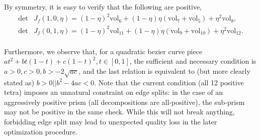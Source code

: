 By symmetry, 
it is easy to verify {that the following are positive},
\begin{align*}
    \det& J_f(1,0,\eta) = (1-\eta)^2 \text{vol}_6 + (1-\eta)\eta (\text{vol}_7 +\text{vol}_5) + \eta^2 \text{vol}_8{,} \\
    \det& J_f(0,1,\eta) = (1-\eta)^2 \text{vol}_{11} + (1-\eta)\eta (\text{vol}_9 +\text{vol}_{10}) + \eta^2 \text{vol}_{12}.\\
\end{align*}

Furthermore, we observe that, for a quadratic bezier curve piece $a t^2 + b t (1-t) + c (1-t)^2, t\in [0,1]$, the sufficient and necessary condition is $a>0, c>0, b > - 2 \sqrt{a c}$, and the last relation is equivalent to (but more clearly stated as) $b > 0 || b^2 - 4 a c < 0$.
Note that the current condition (all 12 positive tetra) imposes an unnatural constraint on edge splits: in the case of an aggressively positive prism (all decompositions are all-positive), the sub-prism may not be positive in the same check. 
While this will not break anything, forbidding edge split may lead to unexpected quality loss in the later optimization procedure.

